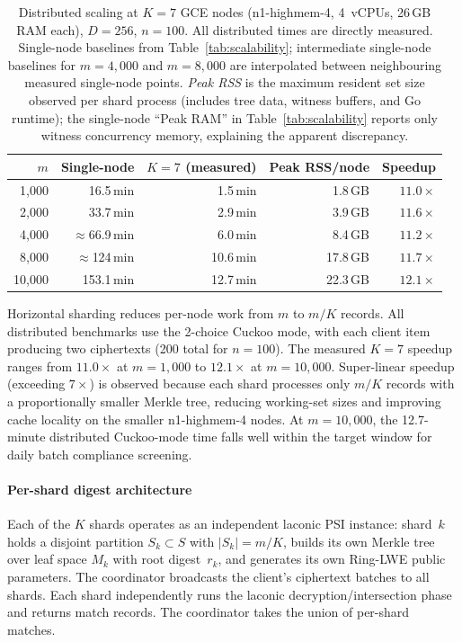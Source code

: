 \documentclass[preprint,12pt]{elsarticle}
\begin{document}
\begin{table}[t]
\centering
\caption{Distributed scaling at $K=7$ GCE nodes (n1-highmem-4, 4~vCPUs,
26\,GB RAM each), $D=256$, $n=100$. All distributed times are directly measured.
Single-node baselines from Table~\ref{tab:scalability}; intermediate
single-node baselines for $m=4{,}000$ and $m=8{,}000$ are interpolated
between neighbouring measured single-node points.
\emph{Peak RSS} is the maximum resident set size observed per shard process
(includes tree data, witness buffers, and Go runtime); the single-node
``Peak RAM'' in Table~\ref{tab:scalability} reports only witness concurrency
memory, explaining the apparent discrepancy.}
\label{tab:distributed}
\begin{tabular}{@{}r r r r r@{}}
\toprule
\textbf{$m$} & \textbf{Single-node} & \textbf{$K=7$ (measured)} & \textbf{Peak RSS/node} & \textbf{Speedup} \\
\midrule
1{,}000  & 16.5\,min   & 1.5\,min   & 1.8\,GB  & $11.0\times$ \\
2{,}000  & 33.7\,min   & 2.9\,min   & 3.9\,GB  & $11.6\times$ \\
4{,}000  & $\approx$66.9\,min & 6.0\,min   & 8.4\,GB  & $11.2\times$ \\
8{,}000  & $\approx$124\,min & 10.6\,min  & 17.8\,GB & $11.7\times$ \\
10{,}000 & 153.1\,min  & 12.7\,min  & 22.3\,GB & $12.1\times$ \\
\bottomrule
\end{tabular}
\end{table}

Horizontal sharding reduces per-node work from $m$ to $m/K$ records.
All distributed benchmarks use the 2-choice Cuckoo mode, with each client
item producing two ciphertexts (200 total for $n=100$).
The measured $K=7$ speedup ranges from
$11.0\times$ at $m=1{,}000$ to $12.1\times$ at $m=10{,}000$. Super-linear
speedup (exceeding $7\times$) is observed because each shard processes only
$m/K$ records with a proportionally smaller Merkle tree, reducing
working-set sizes and improving cache locality on the smaller
n1-highmem-4 nodes. At $m=10{,}000$, the 12.7-minute distributed
Cuckoo-mode time falls well within the target window for daily batch
compliance screening.

\paragraph{Per-shard digest architecture}
Each of the $K$ shards operates as an independent laconic PSI instance:
shard~$k$ holds a disjoint partition $S_k \subset S$ with $|S_k| = m/K$,
builds its own Merkle tree over leaf space $M_k$ with root digest~$r_k$, and
generates its own Ring-LWE public parameters. The coordinator broadcasts the
client's ciphertext batches to all shards.
Each shard independently runs the laconic decryption/intersection phase and
returns match records. The coordinator takes the union of per-shard matches.
\end{document}
